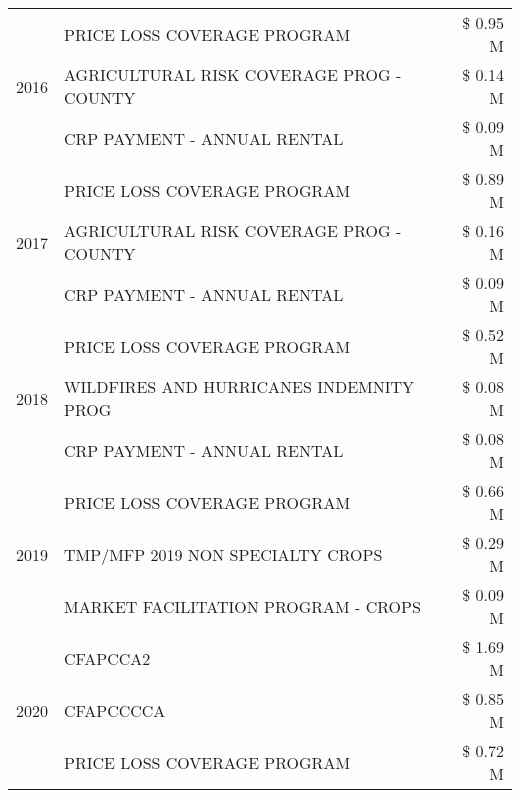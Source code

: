 \begin{tabular}{llr}
\cline{1-3}
\multirow[t]{3}{*}{2016} & PRICE LOSS COVERAGE PROGRAM                   & \$ 0.95 M \\
 & AGRICULTURAL RISK COVERAGE PROG - COUNTY      & \$ 0.14 M \\
 & CRP PAYMENT - ANNUAL RENTAL                   & \$ 0.09 M \\
\cline{1-3}
\multirow[t]{3}{*}{2017} & PRICE LOSS COVERAGE PROGRAM & \$ 0.89 M \\
 & AGRICULTURAL RISK COVERAGE PROG - COUNTY & \$ 0.16 M \\
 & CRP PAYMENT - ANNUAL RENTAL & \$ 0.09 M \\
\cline{1-3}
\multirow[t]{3}{*}{2018} & PRICE LOSS COVERAGE PROGRAM & \$ 0.52 M \\
 & WILDFIRES AND HURRICANES INDEMNITY PROG & \$ 0.08 M \\
 & CRP PAYMENT - ANNUAL RENTAL & \$ 0.08 M \\
\cline{1-3}
\multirow[t]{3}{*}{2019} & PRICE LOSS COVERAGE PROGRAM & \$ 0.66 M \\
 & TMP/MFP 2019 NON SPECIALTY CROPS & \$ 0.29 M \\
 & MARKET FACILITATION PROGRAM - CROPS & \$ 0.09 M \\
\cline{1-3}
\multirow[t]{3}{*}{2020} & CFAPCCA2 & \$ 1.69 M \\
 & CFAPCCCCA & \$ 0.85 M \\
 & PRICE LOSS COVERAGE PROGRAM & \$ 0.72 M \\
\cline{1-3}
\bottomrule
\end{tabular}
